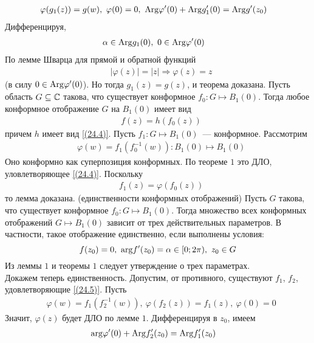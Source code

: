 \begin{align*}
&\varphi(g_1(z)) = g(w), \ \varphi(0) = 0, \ \mathrm{Arg} \varphi'(0) + \mathrm{Arg} g_1'(0) = \mathrm{Arg} g'(z_0)
\end{align*}
Дифференцируя,
\begin{align*}
& \alpha \in \mathrm{Arg} g_1(0), \ 0 \in \mathrm{Arg} \varphi'(0)
\end{align*}
По лемме Шварца для прямой и обратной функций
\begin{align*}
& \left| \varphi(z) \right| = \left| z \right| \Rightarrow \varphi(z) = z
\end{align*}
(в силу $0 \in \mathrm{Arg} \varphi'(0)$). Но тогда $g_1(z) = g(z)$, и теорема
доказана.
\lemma 
Пусть область $G\subseteq \mathbb{C}$ такова, что существует конформное $f_0: G \mapsto
B_1(0)$. Тогда любое конформное отображение $G$ на $B_1(0)$ имеет вид
\begin{align*}
  & f(z) = h(f_0(z))
\end{align*}
причем $h$ имеет вид \eqref{(24.4)}.
\pr
Пусть $f_1: G \mapsto B_1(0)$~--- конформное. Рассмотрим 
\begin{align*}
  & \varphi(w) = f_1(f_0^{-1}(w)): B_1(0) \mapsto B_1(0)
\end{align*}
Оно конформно как суперпозиция конформных. По теореме $1$ это ДЛО,
уловлетворяющее \eqref{(24.4)}. Поскольку
\begin{align*}
& f_1(z) = \varphi(f_0(z))
\end{align*}
то лемма доказана.
\theorem (единственности конформных отображений)
Пусть $G$ такова, что существует конформное $f_0:G \mapsto B_1(0)$. Тогда
множество всех конформных отображений $G \mapsto B_1(0)$ зависит от трех
действительных параметров. В частности, такое отображение единственно, если
выполнены условия:
\begin{equation}\label{(24.5)}
f(z_0) = 0, \ \mathrm{arg} f'(z_0) = \alpha \in [0;2\pi), \ z_0 \in G
\end{equation}
\pr
Из леммы $1$ и теоремы $1$ следует утверждение о трех параметрах.
\\
Докажем теперь единственность. Допустим, от противного, существуют $f_1$, $f_2$,
удовлетворяющие \eqref{(24.5)}. Пусть
\begin{align*}
  & \varphi(w) = f_1(f_2^{-1}(w)), \ \varphi(f_2(z)) = f_1(z), \ \varphi(0) = 0
\end{align*}
Значит, $\varphi(z)$ будет ДЛО по лемме $1$. Дифференцируя в $z_0$, имеем
\begin{align*}
    & \mathrm{arg} \varphi'(0) + \mathrm{Arg} f_2'(z_0) = \mathrm{Arg} f_1'(z_0)
\end{align*}
